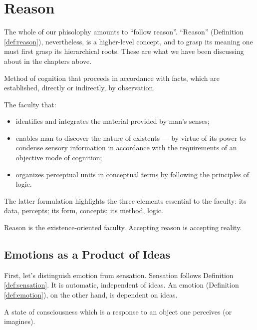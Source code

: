 \chapter{Reason}
\label{cha:reason}

    The whole of our phisolophy amounts to ``follow reason''. ``Reason'' (Definition \ref{def:reason}), nevertheless, is a higher-level concept, and to grasp its meaning one must first grasp its hierarchical roots. These are what we have been discussing about in the chapters above.

        \begin{definition}[Reason]
        \label{def:reason}
            Method of cognition that proceeds in accordance with facts, which are established, directly or indirectly, by observation.
            
            The faculty that:
            \begin{itemize}
                \item identifies and integrates the material provided by man's senses;
                \item enables man to discover the nature of existents — by virtue of its power to condense sensory information in accordance with the requirements of an objective mode of cognition;
                \item organizes perceptual units in conceptual terms by following the principles of logic.
            \end{itemize}
        \end{definition}

        \begin{remark}
            The latter formulation highlights the three elements essential to the faculty: its data, percepts; its form, concepts; its method, logic.
        \end{remark}

    Reason is the existence-oriented faculty. Accepting reason is accepting reality.

    \section{Emotions as a Product of Ideas}
    
        First, let's distinguish emotion from sensation. Sensation follows Definition \ref{def:sensation}. It is automatic, independent of ideas. An emotion (Definition \ref{def:emotion}), on the other hand, is dependent on ideas.

            \begin{definition}[Emotion]
            \label{def:emotion}
                A state of consciousness which is a response to an object one perceives (or imagines).
            \end{definition}

